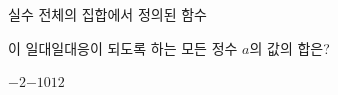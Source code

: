 \hspace*{2mm}\begin{minipage}[t]{\dimexpr\linewidth-2mm\relax}\vspace{0pt}
실수 전체의 집합에서 정의된 함수\par\smallskip{}\par\smallskip\noindent 이 일대일대응이 되도록 하는 모든 정수 $a$의 값의 합은?
\begin{choices32}{$-2$}{$-1$}{$0$}{$1$}{$2$}\end{choices32}\end{minipage}
